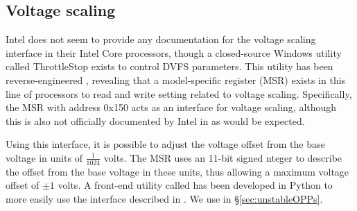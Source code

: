 \subsection{Voltage scaling}
\label{sec:undervolt}

Intel does not seem to provide any documentation for the voltage
scaling interface in their Intel Core processors, though a closed-source
Windows utility called ThrottleStop \cite{throttlestop} exists to control DVFS
parameters. This utility has been reverse-engineered \cite{elersicDoc},
revealing that a model-specific register (MSR) exists in this line of processors
to read and write setting related to voltage scaling. Specifically, the MSR with
address 0x150 acts as an interface for voltage scaling, although this is also
not officially documented by Intel in \cite[Volume 4, §2.13]{intelDevManual} as
would be expected.

Using this interface, it is possible to adjust the voltage offset from the base
voltage in units of $\frac{1}{1024}$ volts. The MSR uses an 11-bit signed 
nteger to describe the offset from the base voltage in these units, thus
allowing a maximum voltage offset of $\pm{1}$ volts. A front-end utility called
 \cite{whewellUndervolt} has been developed in Python to more
easily use the interface described in \cite{elersicDoc}. We use 
in §\ref{sec:unstableOPPs}.

